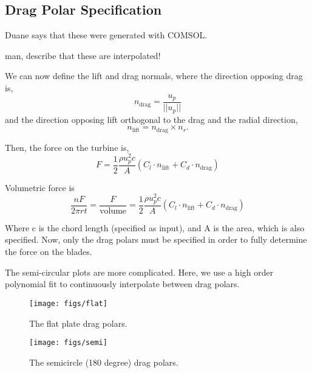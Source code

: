 \subsection{Drag Polar Specification}

Duane says that these were generated with COMSOL.

man, describe that these are interpolated!

We can now define the lift and drag
normals, where the direction opposing drag is, 
\begin{equation}
n_{\text{drag}} = \frac{u_p}{||u_p||} 
\end{equation}
and the direction opposing lift orthogonal to the drag and the radial
direction,  
\begin{equation}
n_{\text{lift}}= n_{\text{drag}} \times n_r. 
\end{equation}

Then, the force on the turbine is, 
\begin{equation}
 \boxed{F = \frac{1}{2}\frac{\rho u_p^2 c}{A}\left(C_l \cdot
					      n_\text{lift} + C_d \cdot n_\text{drag}  \right)}
\end{equation}

Volumetric force is
\begin{equation}
 \boxed{\frac{n F}{2 \pi r t} = \frac{F}{\text{volume}}= \frac{1}{2}\frac{\rho u_p^2 c}{A}\left(C_l \cdot
					      n_\text{lift} + C_d \cdot n_\text{drag}  \right)}
\end{equation}


Where c is the chord length (specified as input), and A is the area,
which is also specified. Now, only the drag polars must be specified in
order to fully determine the force on the blades.

The semi-circular plots are more complicated. Here, we use a high order
polynomial fit to continuously interpolate between drag polars. 

\begin{figure}[!htb]
  \begin{center}
    \texttt{[image: figs/flat]}
    \caption{The flat plate drag polars.} 
    \label{fig:flat_plate_drag}
  \end{center}
\end{figure}

\begin{figure}[!htb]
  \begin{center}
    \texttt{[image: figs/semi]}
    \caption{The semicircle (180 degree) drag polars.} 
    \label{fig:semi_drag}
  \end{center}
\end{figure}

